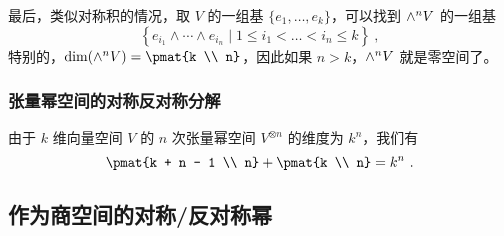 最后，类似对称积的情况，取 $V$ 的一组基 $\{e_1, \dots, e_k\}$，可以找到 ${\large \wedge}^n V$ 的一组基
\begin{equation}
\left\{ e_{i_1} \wedge \cdots \wedge e_{i_n} \mid 1 \leq i_1 < \dots < i_n \leq k \right\}~,
\end{equation}
特别的，$\dim({\large \wedge}^n V) = \pmat{k \\ n}$，因此如果 $n > k$，${\large \wedge}^n V$ 就是零空间了。

\subsubsection{张量幂空间的对称反对称分解}


由于 $k$ 维向量空间 $V$ 的 $n$ 次张量幂空间 $V^{\otimes n}$ 的维度为 $k^n$，我们有
\begin{equation}
\pmat{k + n - 1 \\ n} + \pmat{k \\ n} = k^n~.
\end{equation}


\subsection{作为商空间的对称/反对称幂}